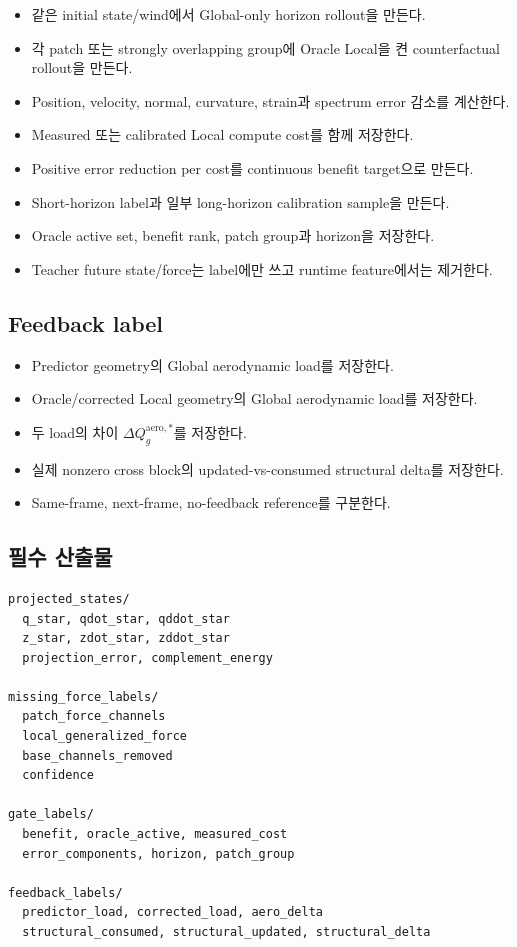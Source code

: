 \documentclass[10pt,a4paper]{article}
\newcommand{\todo}{\textcolor{TodoGray}{\(\square\)}}
\begin{document}
\begin{itemize}
  \item[\todo] 같은 initial state/wind에서 Global-only horizon rollout을 만든다.
  \item[\todo] 각 patch 또는 strongly overlapping group에 Oracle Local을 켠 counterfactual rollout을 만든다.
  \item[\todo] Position, velocity, normal, curvature, strain과 spectrum error 감소를 계산한다.
  \item[\todo] Measured 또는 calibrated Local compute cost를 함께 저장한다.
  \item[\todo] Positive error reduction per cost를 continuous benefit target으로 만든다.
  \item[\todo] Short-horizon label과 일부 long-horizon calibration sample을 만든다.
  \item[\todo] Oracle active set, benefit rank, patch group과 horizon을 저장한다.
  \item[\todo] Teacher future state/force는 label에만 쓰고 runtime feature에서는 제거한다.
\end{itemize}

\subsection*{Feedback label}

\begin{itemize}
  \item[\todo] Predictor geometry의 Global aerodynamic load를 저장한다.
  \item[\todo] Oracle/corrected Local geometry의 Global aerodynamic load를 저장한다.
  \item[\todo] 두 load의 차이 \(\Delta Q_g^{\mathrm{aero},*}\)를 저장한다.
  \item[\todo] 실제 nonzero cross block의 updated-vs-consumed structural delta를 저장한다.
  \item[\todo] Same-frame, next-frame, no-feedback reference를 구분한다.
\end{itemize}

\subsection*{필수 산출물}

\begin{lstlisting}
projected_states/
  q_star, qdot_star, qddot_star
  z_star, zdot_star, zddot_star
  projection_error, complement_energy

missing_force_labels/
  patch_force_channels
  local_generalized_force
  base_channels_removed
  confidence

gate_labels/
  benefit, oracle_active, measured_cost
  error_components, horizon, patch_group

feedback_labels/
  predictor_load, corrected_load, aero_delta
  structural_consumed, structural_updated, structural_delta
\end{lstlisting}
\end{document}
